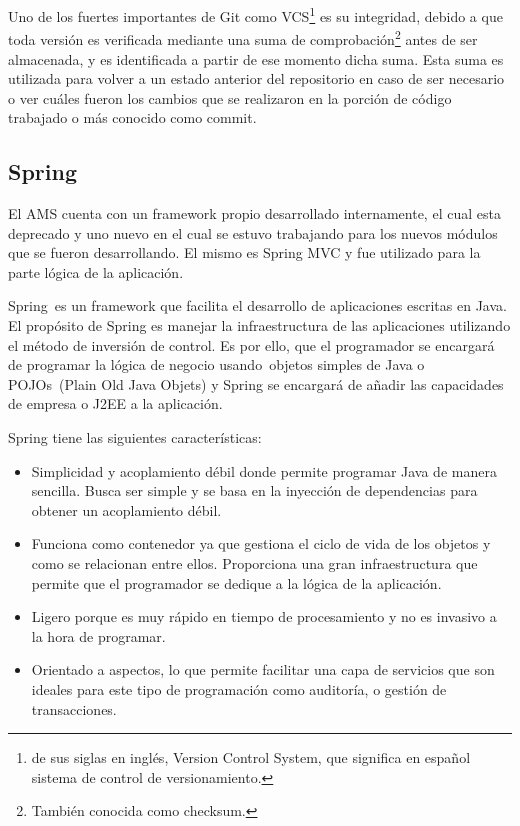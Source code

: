 Uno de los fuertes importantes de Git como VCS\footnote{de sus siglas en inglés, Version Control System, que significa en español sistema de control de versionamiento.} es su integridad, debido a que toda versión es verificada mediante una suma de comprobación\footnote{También conocida como checksum.} antes de ser almacenada, y es identificada a partir de ese momento dicha suma. Esta suma es utilizada para volver a un estado anterior del repositorio en caso de ser necesario o ver cuáles fueron los cambios que se realizaron en la porción de código trabajado o más conocido como commit\citep{chacon2014pro}.

\subsection{Spring}
El AMS cuenta con un framework propio desarrollado internamente, el cual esta deprecado y uno nuevo en el cual se estuvo trabajando para los nuevos módulos que se fueron desarrollando. El mismo es Spring MVC y fue utilizado para la parte lógica de la aplicación.

Spring es un framework que facilita el desarrollo de aplicaciones escritas en Java. El propósito de Spring es manejar la infraestructura de las aplicaciones utilizando el método de inversión de control. Es por ello, que el programador se encargará de programar la lógica de negocio usando objetos simples de Java o POJOs (Plain Old Java Objets) y Spring se encargará de añadir las capacidades de empresa o J2EE a la aplicación\citep{bauer2005hibernate}.

Spring tiene las siguientes características:
\begin{itemize}
	\item Simplicidad y acoplamiento débil donde permite programar Java de manera sencilla. Busca ser simple y se basa en la inyección de dependencias para obtener un acoplamiento débil.
	\item Funciona como contenedor ya que gestiona el ciclo de vida de los objetos y como se relacionan entre ellos. Proporciona una gran infraestructura que permite que el programador se dedique a la lógica de la aplicación.
	\item Ligero porque es muy rápido en tiempo de procesamiento y no es invasivo a la hora de programar.
	\item Orientado a aspectos, lo que permite facilitar una capa de servicios que son ideales para este tipo de programación como auditoría, o gestión de transacciones.
\end{itemize} 

